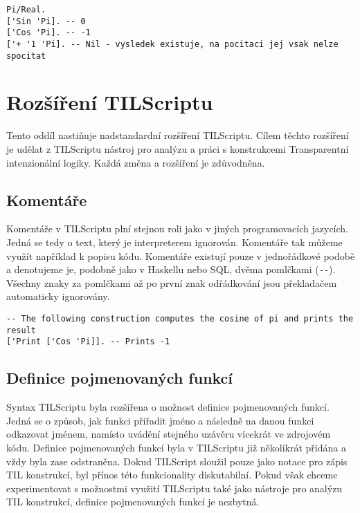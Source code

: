 \begin{lstlisting}[caption={Příklad využití symbolických hodnot}]
Pi/Real.
['Sin 'Pi]. -- 0
['Cos 'Pi]. -- -1
['+ '1 'Pi]. -- Nil - vysledek existuje, na pocitaci jej vsak nelze spocitat
\end{lstlisting}

\section{Rozšíření TILScriptu}

Tento oddíl nastiňuje nadstandardní rozšíření TILScriptu. Cílem těchto rozšíření je udělat
z TILScriptu nástroj pro analýzu a práci s konstrukcemi Transparentní intenzionální logiky. Každá
změna a rozšíření je zdůvodněna.

\subsection{Komentáře}

Komentáře v TILScriptu plní stejnou roli jako v jiných programovacích jazycích. Jedná se tedy
o text, který je interpreterem ignorován. Komentáře tak můžeme využít například k popisu kódu.
Komentáře existují pouze v jednořádkové podobě a denotujeme je, podobně jako v Haskellu nebo SQL,
dvěma pomlčkami (\lstinline{--}). Všechny znaky za pomlčkami až po první znak odřádkování jsou
překladačem automaticky ignorovány.

\begin{lstlisting}[caption={Příklad využití komentářů}]
-- The following construction computes the cosine of pi and prints the result
['Print ['Cos 'Pi]]. -- Prints -1
\end{lstlisting}

\subsection{Definice pojmenovaných funkcí} \label{fn-definition}

Syntax TILScriptu byla rozšířena o možnost definice pojmenovaných funkcí. Jedná se o způsob, jak
funkci přiřadit jméno a následně na danou funkci odkazovat jménem, namísto uvádění stejného uzávěru
vícekrát ve zdrojovém kódu. Definice pojmenovaných funkcí byla v TILScriptu již několikrát přidána
a vždy byla zase odstraněna. Dokud TILScript sloužil pouze jako notace pro zápis TIL konstrukcí,
byl přínos této funkcionality diskutabilní. Pokud však chceme experimentovat s možnostmi využití
TILScriptu také jako nástroje pro analýzu TIL konstrukcí, definice pojmenovaných funkcí je
nezbytná.

